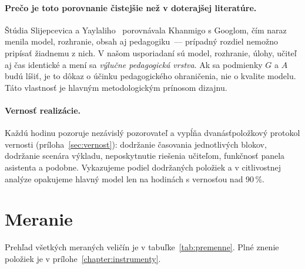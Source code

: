 \paragraph{Prečo je toto porovnanie čistejšie než v doterajšej literatúre.} Štúdia Slijepcevica a Yaylaliho~\cite{slijepcevic2025khanmigo} porovnávala Khanmigo s Googlom, čím naraz menila model, rozhranie, obsah aj pedagogiku~--- prípadný rozdiel nemožno pripísať žiadnemu z nich. V našom usporiadaní sú model, rozhranie, úlohy, učiteľ aj čas identické a mení sa \emph{výlučne pedagogická vrstva}. Ak sa podmienky $G$ a $A$ budú líšiť, je to dôkaz o účinku pedagogického ohraničenia, nie o kvalite modelu. Táto vlastnosť je hlavným metodologickým prínosom dizajnu.

\paragraph{Vernosť realizácie.} Každú hodinu pozoruje nezávislý pozorovateľ a vypĺňa dvanásťpoložkový protokol vernosti (príloha~\ref{sec:vernost}): dodržanie časovania jednotlivých blokov, dodržanie scenára výkladu, neposkytnutie riešenia učiteľom, funkčnosť panela asistenta a podobne. Vykazujeme podiel dodržaných položiek a v citlivostnej analýze opakujeme hlavný model len na hodinách s vernosťou nad 90\,\%.

\section{Meranie}
\label{sec:meranie}

Prehľad všetkých meraných veličín je v tabuľke~\ref{tab:premenne}. Plné znenie položiek je v prílohe~\ref{chapter:instrumenty}.

